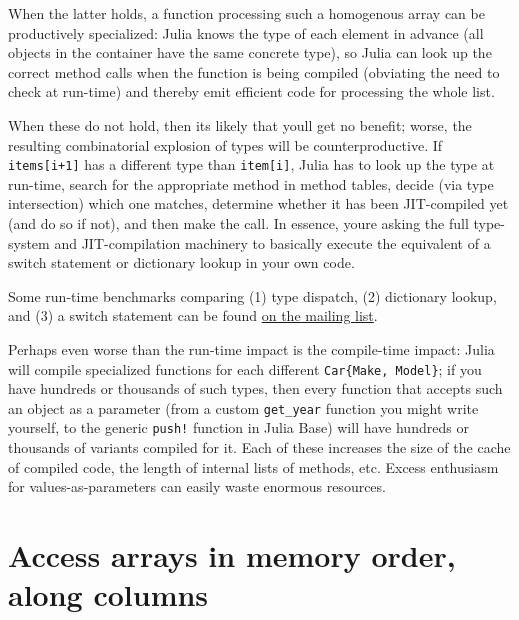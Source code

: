 When the latter holds, a function processing such a homogenous array can be productively specialized: Julia knows the type of each element in advance (all objects in the container have the same concrete type), so Julia can {\textquotedbl}look up{\textquotedbl} the correct method calls when the function is being compiled (obviating the need to check at run-time) and thereby emit efficient code for processing the whole list.



When these do not hold, then it{\textquotesingle}s likely that you{\textquotesingle}ll get no benefit; worse, the resulting {\textquotedbl}combinatorial explosion of types{\textquotedbl} will be counterproductive. If \texttt{items[i+1]} has a different type than \texttt{item[i]}, Julia has to look up the type at run-time, search for the appropriate method in method tables, decide (via type intersection) which one matches, determine whether it has been JIT-compiled yet (and do so if not), and then make the call. In essence, you{\textquotesingle}re asking the full type- system and JIT-compilation machinery to basically execute the equivalent of a switch statement or dictionary lookup in your own code.



Some run-time benchmarks comparing (1) type dispatch, (2) dictionary lookup, and (3) a {\textquotedbl}switch{\textquotedbl} statement can be found \href{https://groups.google.com/forum/\#!msg/julia-users/jUMu9A3QKQQ/qjgVWr7vAwAJ}{on the mailing list}.



Perhaps even worse than the run-time impact is the compile-time impact: Julia will compile specialized functions for each different \texttt{Car\{Make, Model\}}; if you have hundreds or thousands of such types, then every function that accepts such an object as a parameter (from a custom \texttt{get\_year} function you might write yourself, to the generic \texttt{push!} function in Julia Base) will have hundreds or thousands of variants compiled for it. Each of these increases the size of the cache of compiled code, the length of internal lists of methods, etc. Excess enthusiasm for values-as-parameters can easily waste enormous resources.



\hypertarget{16800011477786249644}{}


\section{Access arrays in memory order, along columns}



